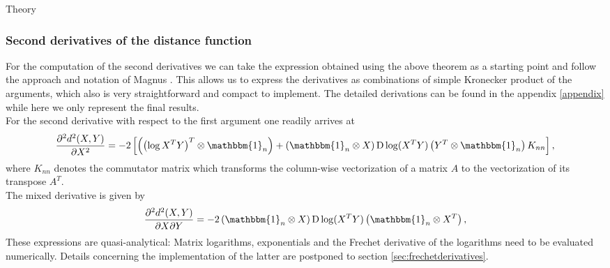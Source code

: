 \begin{chapter}{Theory}
\subsubsection{Second derivatives of the distance function} %
\label{ssub:SecondDerSO}
For the computation of the second derivatives we can take the expression obtained using the above theorem as a starting point and follow the approach and notation of Magnus \cite{Magnus}. 
This allows us to express the derivatives as combinations of simple Kronecker product of the arguments, which also is very straightforward and compact to implement. 
The detailed derivations can be found in the appendix \ref{appendix} while here we only represent the final results. \\
For the second derivative with respect to the first argument one readily arrives at
\begin{equation}
    \label{eq:son_xx_der}
    \frac{\partial^2 d^2(X,Y)}{\partial X^2} = -2\left[\left(\left(\log X^TY\right)^T\otimes\mathbbm{1}_n\right) + \left(\mathbbm{1}_n\otimes X \right)\operatorname{D}\log(X^TY) \left(Y^T\otimes\mathbbm{1}_n \right) K_{nn}\right],
\end{equation}
where $K_{nn}$ denotes the commutator matrix which transforms the column-wise vectorization of a matrix $A$ to the vectorization of its transpose $A^T$.\\

The mixed derivative is given by
\begin{equation}
    \label{eq:son_xy_der}
    \frac{\partial^2 d^2(X,Y)}{\partial X\partial Y} = -2\left(\mathbbm{1}_n\otimes X \right)\operatorname{D}\log(X^TY) \left(\mathbbm{1}_n\otimes X^T \right),
\end{equation}
These expressions are quasi-analytical: Matrix logarithms, exponentials and the Frechet derivative of the logarithms need to be evaluated numerically. Details concerning the 
implementation of the latter are postponed to section \ref{sec:frechetderivatives}.


\end{chapter}

